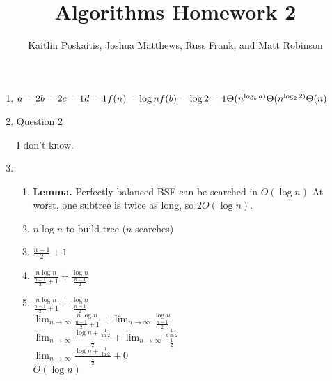 \documentclass[12pt]{article}
\title{\bf Algorithms Homework 2}
\author{Kaitlin Poskaitis, Joshua Matthews, Russ Frank, and Matt Robinson}
\date{}
\begin{document}
\maketitle

\begin{enumerate}

\item

  $a = 2\\
  b = 2\\
  c = 1\\
  d = 1\\
  f(n) = \log n\\
  f(b) = \log 2 = 1\\
  \Theta (n^{\log_b a)}\\
  \Theta (n^{\log_2 2)}\\
  \Theta (n)\\$

\item Question 2

  I don't know.

\item

  \begin{enumerate}
    \item \textbf{Lemma.} Perfectly balanced BSF can be searched in $O(\log n)$
    At worst, one subtree is twice as long, so $2O(\log n)$.

    \item $n \log n$ to build tree ($n$ searches)

    \item $\frac{n - 1}{2} + 1$

    \item $\frac{n\log n}{\frac{n - 1}{2} + 1} + \frac{\log n}{\frac{n - 1}{2}}$
    
    \item $\frac{n\log n}{\frac{n - 1}{2} + 1} + \frac{\log n}{\frac{n - 1}{2}}$\\
    $\lim_{n \to \infty} \frac{n\log n}{\frac{n - 1}{2} + 1} + \lim_{n \to \infty} \frac{\log n}{\frac{n - 1}{2}}$\\
    $\lim_{n \to \infty} \frac{\log n + \frac{1}{\ln 2}}{\frac{1}{2}} + \lim_{n \to \infty} \frac{\frac{1}{n\ln 2}}{\frac{1}{2}}$\\
    $\lim_{n \to \infty} \frac{\log n + \frac{1}{\ln 2}}{\frac{1}{2}} + 0$\\
    $O(\log n)$
  \end{enumerate}


\end{enumerate}
\end{document}
